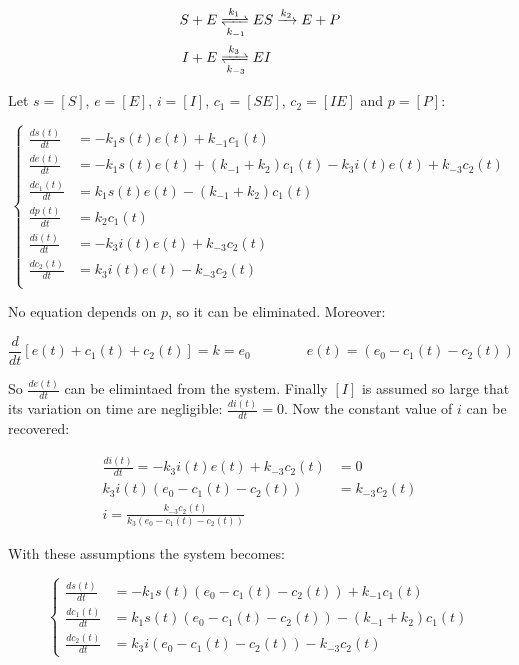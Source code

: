   \begin{align*}
    S + E &\xrightleftharpoons[k_{-1}]{k_1} ES \xrightarrow{k_2} E + P\\
    I + E &\xrightleftharpoons[k_{-3}]{k_3} EI\\
  \end{align*}

  Let $s = [S]$, $e = [E]$, $i=[I]$, $c_1 = [SE]$, $c_2 = [IE]$ and $p = [P]$:

  $$\begin{cases}
    \frac{ds(t)}{dt} &= -k_1s(t)e(t) + k_{-1}c_1(t)\\
    \frac{de(t)}{dt} &= -k_1s(t)e(t) + (k_{-1}+k_2)c_1(t) -k_3i(t)e(t) + k_{-3}c_2(t)\\
    \frac{dc_1(t)}{dt} &= k_1s(t)e(t) - (k_{-1}+k_2)c_1(t)\\
    \frac{dp(t)}{dt} &= k_2c_1(t)\\
    \frac{di(t)}{dt} &= -k_3i(t)e(t) + k_{-3}c_2(t)\\
    \frac{dc_2(t)}{dt} &= k_3i(t)e(t) - k_{-3}c_2(t)\\
  \end{cases}$$

  No equation depends on $p$, so it can be eliminated.
  Moreover:

  $$\frac{d}{dt}[e(t)+c_1(t) + c_2(t)] = k = e_0\qquad\qquad e(t) = (e_0-c_1(t) - c_2(t))$$

  So $\frac{de(t)}{dt}$ can be elimintaed from the system.
  Finally $[I]$ is assumed so large that its variation on time are negligible: $\frac{di(t)}{dt} = 0$.
  Now the constant value of $i$ can be recovered:

  \begin{align*}
    \frac{di(t)}{dt} = -k_3i(t)e(t) + k_{-3}c_2(t) &= 0\\
    k_3i(t)(e_0 -c_1(t) - c_2(t)) &=  k_{-3}c_2(t)\\
    i = \frac{k_{-3}c_2(t)}{k_3(e_0 - c_1(t) - c_2(t))}
  \end{align*}

  With these assumptions the system becomes:

  $$\begin{cases}
    \frac{ds(t)}{dt} &= -k_1s(t)(e_0-c_1(t) - c_2(t)) + k_{-1}c_1(t)\\
    \frac{dc_1(t)}{dt} &= k_1s(t)(e_0-c_1(t) - c_2(t)) - (k_{-1}+k_2)c_1(t)\\
    \frac{dc_2(t)}{dt} &= k_3i(e_0-c_1(t)-c_2(t))-k_{-3}c_2(t)
  \end{cases}$$

